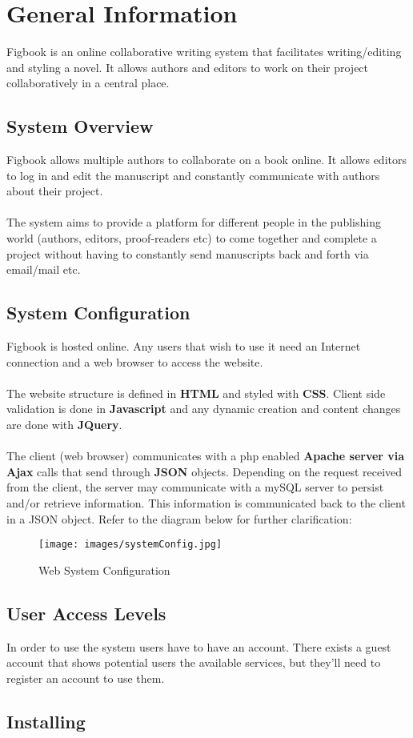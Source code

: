 \section{General Information}
\par{Figbook is an online collaborative writing system that facilitates writing/editing and styling a novel. It allows authors and editors to work on their project collaboratively in a central place.}

\subsection{System Overview}
\par{Figbook allows multiple authors to collaborate on a book online. It allows editors to log in and edit the manuscript and constantly communicate with authors about their project. \\ \\The system aims to provide a platform for different people in the publishing world (authors, editors, proof-readers etc) to come together and complete a project without having to constantly send manuscripts back and forth via email/mail etc.}

\subsection{System Configuration}
\par{Figbook is hosted online. Any users that wish to use it need an Internet connection and a web browser to access the website.\\ \\The website structure is defined in \textbf{HTML} and styled with \textbf{CSS}. Client side validation is done in \textbf{Javascript} and any dynamic creation and content changes are done with \textbf{JQuery}.\\ \\The client (web browser) communicates with a php enabled \textbf{Apache server via Ajax} calls that send through \textbf{JSON} objects. Depending on the request received from the client, the server may communicate with a mySQL server to persist and/or retrieve information. This information is communicated back to the client in a JSON object. Refer to the diagram below for further clarification:}

\begin{figure}
	\texttt{[image: images/systemConfig.jpg]}
	\caption{Web System Configuration}
\end{figure}

\subsection{User Access Levels}
In order to use the system users have to have an account. There exists a guest account that shows potential users the available services, but they'll need to register an account to use them.

\subsection{Installing}
